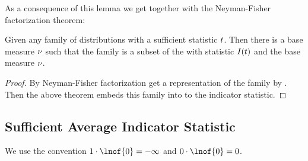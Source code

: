 \documentclass[aps,onecolumn,nofootinbib,pra]{article}
\begin{document}
    As a consequence of this lemma we get together with the Neyman-Fisher factorization theorem:

    \begin{theorem}
        Given any family of distributions with a sufficient statistic $t$.
        Then there is a base measure $\nu$ such that the family is a subset of the \HybridLogicNetworks{} with statistic $I(t)$ and the base measure $\nu$.
    \end{theorem}
    \begin{proof}
        By Neyman-Fisher factorization get a representation of the family by \ComputationActivationNetworks{}.
        Then the above theorem embeds this family into \HybridLogicNetworks{} to the indicator statistic.
    \end{proof}

    \subsection{Sufficient Average Indicator Statistic}

    We use the convention $1\cdot \lnof{0}=-\infty$ and $0\cdot\lnof{0}=0$.
\end{document}
